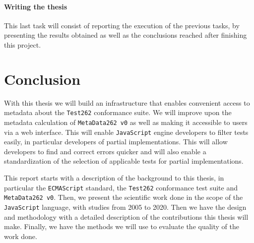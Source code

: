 \documentclass[runningheads]{llncs}
\begin{document}
\paragraph{Writing the thesis}
This last task will consist of reporting the execution of the previous tasks, by presenting the results obtained as well as the conclusions reached after finishing this project.




\section{Conclusion}
\label{sec:Conclusion}
With this thesis we will build an infrastructure that enables convenient access to metadata about the \texttt{Test262} conformance suite. We will improve upon the metadata calculation of \texttt{MetaData262 v0} as well as making it accessible to users via a web interface. This will enable \texttt{JavaScript} engine developers to filter tests easily, in particular developers of partial implementations. This will allow developers to find and correct errors quicker and will also enable a standardization of the selection of applicable tests for partial implementations.

This report starts with a description of the background to this thesis, in particular the \texttt{ECMAScript} standard, the \texttt{Test262} conformance test suite and \texttt{MetaData262 v0}. Then, we present the scientific work done in the scope of the \texttt{JavaScript} language, with studies from 2005 to 2020. Then we have the design and methodology with a detailed description of the contributions this thesis will make. Finally, we have the methods we will use to evaluate the quality of the work done.



%
%

%
%
%
% 
% 
%


\end{document}
